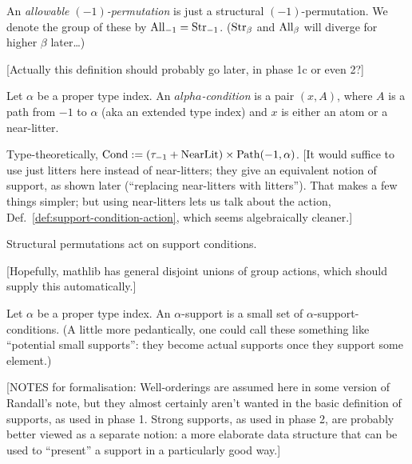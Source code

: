 \begin{definition}
  \label{def:allowable-perm-atoms}
  An \emph{allowable $(-1)$-permutation} is just a structural $(-1)$-permutation. We denote the group of these by $\mathrm{All}_{-1} = \mathrm{Str}_{-1}$.  ($\mathrm{Str}_\beta$ and $\mathrm{All}_\beta$ will diverge for higher $\beta$ later…)

  [Actually this definition should probably go later, in phase 1c or even 2?]
\end{definition}

\begin{definition}
  \label{def:support-condition}
  Let $\alpha$ be a proper type index. An \emph{$alpha$-condition} is a pair $(x,A)$, where $A$ is a path from $-1$ to $\alpha$ (aka an extended type index) and $x$ is either an atom or a near-litter.

  Type-theoretically, $\mathrm{Cond} := (\tau_{-1} + \mathrm{NearLit}) \times \mathrm{Path}(-1,\alpha)$.
  [It would suffice to use just litters here instead of near-litters; they give an equivalent notion of support, as shown later (“replacing near-litters with litters”).  That makes a few things simpler; but using near-litters lets us talk about the action, Def.~\ref{def:support-condition-action}, which seems algebraically cleaner.]
\end{definition}

\begin{definition}
  \label{def:support-condition-action}

  Structural permutations act on support conditions.

  [Hopefully, mathlib has general disjoint unions of group actions, which should supply this automatically.]
\end{definition}

\begin{definition}
\label{def:support}
Let $\alpha$ be a proper type index. An $\alpha$-support is a small set of $\alpha$-support-conditions.  (A little more pedantically, one could call these something like “potential small supports”: they become actual supports once they support some element.)

[NOTES for formalisation: Well-orderings are assumed here in some version of Randall’s note, but they almost certainly aren’t wanted in the basic definition of supports, as used in phase 1. Strong supports, as used in phase 2, are probably better viewed as a separate notion: a more elaborate data structure that can be used to “present” a support in a particularly good way.]
\end{definition}

